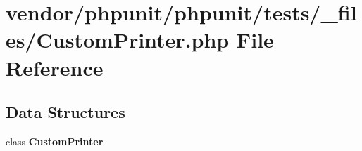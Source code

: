 \section{vendor/phpunit/phpunit/tests/\+\_\+files/\+Custom\+Printer.php File Reference}
\label{_custom_printer_8php}
\subsection*{Data Structures}
\begin{DoxyCompactItemize}
\item 
class {\bf Custom\+Printer}
\end{DoxyCompactItemize}

